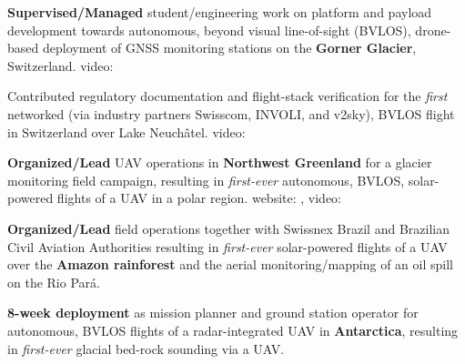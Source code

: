 \begin{cventries}
{\begin{cvitems}
%
\item \textbf{Supervised/Managed} student/engineering work on platform and payload development towards autonomous, beyond visual line-of-sight (BVLOS), drone-based deployment of GNSS monitoring stations on the \textbf{Gorner Glacier}, Switzerland.  video: 
%
\item Contributed regulatory documentation and flight-stack verification for the \emph{first} networked (via industry partners Swisscom, INVOLI, and v2sky), BVLOS flight in Switzerland over Lake Neuch\^{a}tel.  video: 
%
\item \textbf{Organized/Lead} UAV operations in \textbf{Northwest Greenland} for a glacier monitoring field campaign, resulting in \emph{first-ever} autonomous, BVLOS, solar-powered flights of a UAV in a polar region.  website: , video: 
%   
\item \textbf{Organized/Lead} field operations together with Swissnex Brazil and Brazilian Civil Aviation Authorities resulting in \emph{first-ever} solar-powered flights of a UAV over the \textbf{Amazon rainforest} and the aerial monitoring/mapping of an oil spill on the Rio Par\'{a}. %
%    
\item \textbf{8-week deployment} as mission planner and ground station operator for autonomous, BVLOS flights of a radar-integrated UAV in \textbf{Antarctica}, resulting in \emph{first-ever} glacial bed-rock sounding via a UAV.  
%
\end{cvitems}
}

\vspace{\acvSectionContentTopSkip}

\end{cventries}

